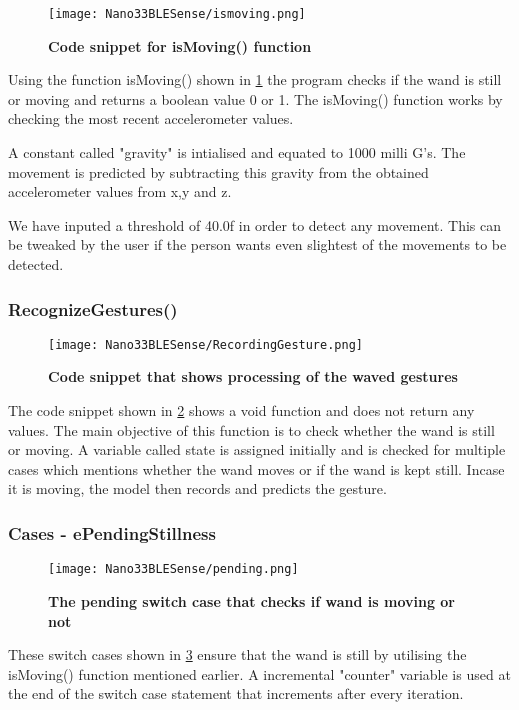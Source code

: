 \begin{figure}[h!]
    \texttt{[image: Nano33BLESense/ismoving.png]}
    \caption{\textbf{Code snippet for isMoving() function }}
    \label{fig:ismoving()}
\end{figure}


Using the function isMoving() shown in \ref{fig:ismoving()} the program checks if the wand is still or moving and returns a boolean value 0 or 1. The isMoving() function works by checking the most recent accelerometer values. 

A constant called "gravity" is intialised and equated to 1000 milli G's. The movement is predicted by subtracting this gravity from the obtained accelerometer values from x,y and z. 

We have inputed a threshold of 40.0f in order to detect any movement. This can be tweaked by the user if the person wants even slightest of the movements to be detected. 

\subsubsection{RecognizeGestures()}

\begin{figure}[h!]
    \texttt{[image: Nano33BLESense/RecordingGesture.png]}
    \caption{\textbf{Code snippet that shows processing of the waved gestures}}
    \label{fig:img14}
\end{figure}

The code snippet shown in \ref{fig:img14} shows a void function and does not return any values. The main objective of this function is to check whether the wand is still or moving. A variable called state is assigned initially and is checked for multiple cases which mentions whether the wand moves or if the wand is kept still. Incase it is moving, the model then records and predicts the gesture.

\subsubsection{Cases - ePendingStillness} 


\begin{figure}[h!]
    \texttt{[image: Nano33BLESense/pending.png]}
    \caption{\textbf{The pending switch case that checks if wand is moving or not}}
    \label{pending}
\end{figure}
These switch cases shown in \ref{pending} ensure that the wand is still by utilising the isMoving() function mentioned earlier. A incremental "counter" variable is used at the end of the switch case statement that increments after every iteration. 

